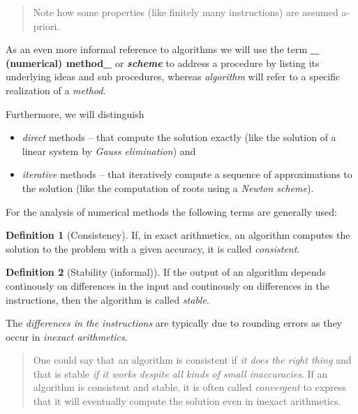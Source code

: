 \documentclass[
]{book}
\providecommand{\tightlist}{%
  \setlength{\itemsep}{0pt}\setlength{\parskip}{0pt}}
\newenvironment {JHSAYS} [0] {\begin{quote}\color{jhsc}} {\end{quote}}
\theoremstyle{definition}
\newtheorem{definition}{Definition}[chapter]
\theoremstyle{definition}
\theoremstyle{definition}
\theoremstyle{definition}
\theoremstyle{remark}
\begin{document}
\leavevmode\hypertarget{rem-coors}{}%
\begin{JHSAYS}
Note how some properties (like finitely many instructions) are assumed a-priori.

\end{JHSAYS}

As an even more informal reference to algorithms we will use the term \textbf{\_ (numerical) method\_} or \textbf{\emph{scheme}} to address a procedure by listing its underlying ideas and sub procedures, whereas \emph{algorithm} will refer to a specific realization of a \emph{method}.

Furthermore, we will distinguish

\begin{itemize}
\tightlist
\item
  \emph{direct} methods -- that compute the solution exactly (like the solution of a linear system by \emph{Gauss elimination}) and
\item
  \emph{iterative} methods -- that iteratively compute a sequence of approximations to the solution (like the computation of roots using a \emph{Newton scheme}).
\end{itemize}

For the analysis of numerical methods the following terms are generally used:

\begin{definition}[Consistency]
\protect\hypertarget{def:consistency}{}\label{def:consistency}If, in exact arithmetics, an algorithm computes the solution to the problem with a given accuracy, it is called \emph{consistent}.
\end{definition}

\begin{definition}[Stability (informal)]
\protect\hypertarget{def:stability}{}\label{def:stability}If the output of an algorithm depends continously on differences in the input and continously on differences in the instructions, then the algorithm is called \emph{stable}.
\end{definition}

The \emph{differences in the instructions} are typically due to rounding errors as they occur in \emph{inexact arithmetics}.

\leavevmode\hypertarget{rem-coors}{}%
\begin{JHSAYS}
One could say that an algorithm is consistent if \emph{it does the right thing} and that is stable \emph{if it works despite all kinds of small inaccuracies}. If an algorithm is consistent and stable, it is often called \emph{convergent} to express that it will eventually compute the solution even in inexact arithmetics.

\end{JHSAYS}
\end{document}
